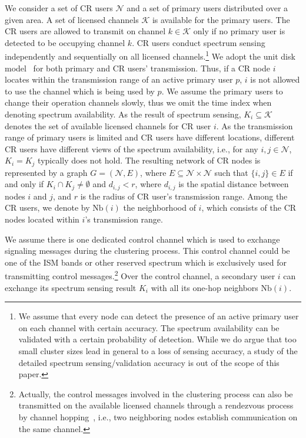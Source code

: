 \documentclass[times]{ettauth}
\theoremstyle{mytheoremstyle}
\theoremstyle{mytheoremstyle}
\theoremstyle{mytheoremstyle}
\begin{document}
We consider a set of CR users $\mathcal{N}$ and a set of primary users distributed over a given area.
A set of licensed channels $\mathcal{K}$ is available for the primary users. 
The CR users are allowed to transmit on channel $k \in \mathcal{K}$ only if no primary user is detected to be occupying channel $k$. 
CR users conduct spectrum sensing independently and sequentially on all licensed channels.\footnote{We assume that every node can detect the presence of an active primary user on each channel with certain accuracy. The spectrum availability can be validated with a certain probability of detection. While we do argue that too small cluster sizes lead in general to a loss of sensing accuracy, a study of the detailed spectrum sensing/validation accuracy is out of the scope of this paper.}
We adopt the unit disk model~\cite{unitDiskModel} for both primary and CR users' transmission.
Thus, if a CR node $i$ locates within the transmission range of an active primary user $p$, $i$ is not allowed to use the channel which is being used by $p$.
We assume the primary users to change their operation channels slowly, thus we omit the time index when denoting spectrum availability. 
As the result of spectrum sensing, $K_i \subseteq \mathcal{K}$ denotes the set of available licensed channels for CR user $i$.
As the transmission range of primary users is limited and CR users have different locations, different CR users have different views of the spectrum availability, i.e., for any $i, j \in \mathcal{N}$, $K_{i} = K_{j}$ typically does not hold.
The resulting network of CR nodes is represented by a graph $G = (\mathcal{N}, E)$, where $E \subseteq \mathcal{N} \times \mathcal{N}$ such that $\{i, j\} \in E$ if and only if $K_{i} \cap K_{j}\neq \emptyset$ and $d_{i,j} < r$, where $d_{i,j}$ is the spatial distance between nodes $i$ and $j$, and $r$ is the radius of CR user's transmission range. 
%
Among the CR users, we denote by $\text{Nb}(i)$ the neighborhood of $i$, which consists of the CR nodes located within $i$'s transmission range. 

We assume there is one dedicated control channel which is used to exchange signaling messages during the clustering process.
This control channel could be one of the ISM bands or other reserved spectrum which is exclusively used for transmitting control messages.\footnote{Actually, the control messages involved in the clustering process can also be transmitted on the available licensed channels through a rendezvous process by channel hopping~\cite{channelHopping_Rendezvous_2014, Gu_distributed_rendezvous_2014}, i.e., two neighboring nodes establish communication on the same channel.}
Over the control channel, a secondary user $i$ can exchange its spectrum sensing result $K_i$ with all its one-hop neighbors $\text{Nb}(i)$.
\end{document}
